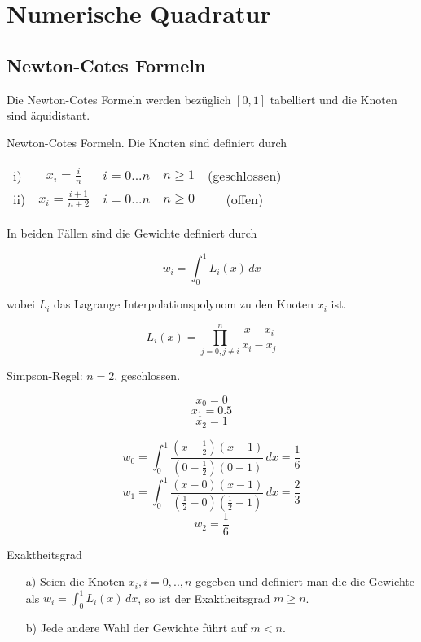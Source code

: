 \section{Numerische Quadratur}

\subsection{}
\subsection{Newton-Cotes Formeln}

Die Newton-Cotes Formeln werden bezüglich $[0, 1]$ tabelliert und die Knoten sind äquidistant.

\begin{definition}[Definition I.5] Newton-Cotes Formeln. Die Knoten sind definiert durch

	\begin{tabular}{ l c c c c }
		i) & $x_i = \frac{i}{n}$ & $i=0...n$ & $n \ge 1$ & (geschlossen) \\
		ii) & $x_i = \frac{i+1}{n+2}$ & $i=0...n$ & $n \ge 0$ & (offen) \\
	\end{tabular}
	
	In beiden Fällen sind die Gewichte definiert durch
	
	$$w_i = \int^1_0\!L_i(x) \,dx$$	
	
	wobei $L_i$ das Lagrange Interpolationspolynom zu den Knoten $x_i$ ist.
	
	$$L_i(x) = \prod_{j=0, j \ne i}^n \frac{x-x_i}{x_i-x_j}$$
\end{definition}

\begin{example} Simpson-Regel: $n=2$, geschlossen.

	$$x_0 = 0$$ 
	$$x_1 = 0.5$$
	$$x_2 = 1$$
	
	$$w_0 = \int_0^1\!\frac{(x-\frac{1}{2})(x-1)}{(0-\frac{1}{2})(0-1)}\,dx = \frac{1}{6}$$ 
	$$w_1 = \int_0^1\!\frac{(x-0)(x-1)}{(\frac{1}{2}-0)(\frac{1}{2}-1)}\,dx = \frac{2}{3}$$ 
	$$w_2 = \frac{1}{6}$$
	
\end{example}

\begin{theorem}[Satz I.3]
	Exaktheitsgrad
	
	\begin{itemize}
		\item[a)] Seien die Knoten $x_i, i = 0, .., n$ gegeben und definiert man die die Gewichte als $w_i = \int^1_0\!L_i(x) \,dx$, so ist der Exaktheitsgrad $m \ge n$.
		\item[b)] Jede andere Wahl der Gewichte führt auf $m < n$.
	\end{itemize}
\end{theorem}

